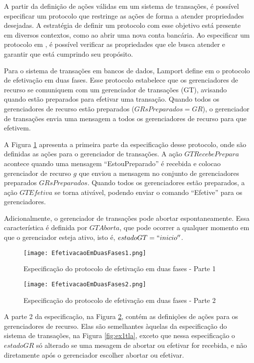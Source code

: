 A partir da definição de ações válidas em um sistema de transações, é possível
especificar um protocolo que restringe as ações de forma a atender propriedades
desejadas. A estratégia de definir um protocolo com esse objetivo está presente
em diversos contextos, como ao abrir uma nova conta bancária. Ao especificar um
protocolo em \TLAA, é possível verificar as propriedades que ele busca atender e
garantir que está cumprindo seu propósito.

Para o sistema de transações em bancos de dados, Lamport define em
\cite{video-protocol} o protocolo de efetivação em duas fases. Esse protocolo
estabelece que os gerenciadores de recurso se comuniquem com um gerenciador de
transações (GT), avisando quando estão preparados para efetivar uma transação.
Quando todos os gerenciadores de recurso estão preparados ($GRsPreparados =
GR$), o gerenciador de transações envia uma mensagem a todos os gerenciadores de
recurso para que efetivem.

A Figura \ref{fig:ex3tlap1} apresenta a primeira
parte da especificação desse protocolo, onde são definidas as ações para o
gerenciador de transações. A ação $GTRecebePrepara$ acontece quando uma mensagem
``EstouPreparado'' é recebida e colocao gerenciador de recurso $g$ que enviou a
mensagem no conjunto de gerenciadores preparados $GRsPreparados$. Quando todos
os gerenciadores estão preparados, a ação $GTEfetiva$ se torna ativável, podendo
enviar o comando ``Efetive'' para os gerenciadores.

Adicionalmente, o gerenciador de transações pode abortar espontaneamente. Essa
característica é definida por $GTAborta$, que pode ocorrer a qualquer momento em
que o gerenciador esteja ativo, isto é, $estadoGT = ``inicio''$.

\begin{figure}[hb]
  \centering
  \texttt{[image: EfetivacaoEmDuasFases1.png]}
  \caption{Especificação do protocolo de efetivação em duas fases - Parte 1}
\label{fig:ex3tlap1}
\end{figure}

\begin{figure}[ht]
  \centering
  \texttt{[image: EfetivacaoEmDuasFases2.png]}
 \caption{Especificação do protocolo de efetivação em duas fases - Parte 2}
\label{fig:ex3tlap2}
\end{figure}

A parte 2 da especificação, na Figura \ref{fig:ex3tlap2}, contém as definições
de ações para os gerenciadores de recurso. Elas são semelhantes àquelas da
especificação do sistema de transações, na Figura \ref{fig:ex1tla}, exceto que
nessa especificação o $estadoGR$ só alterado se uma mesagem de abortar ou
efetivar for recebida, e não diretamente após o gerenciador escolher abortar ou efetivar.

